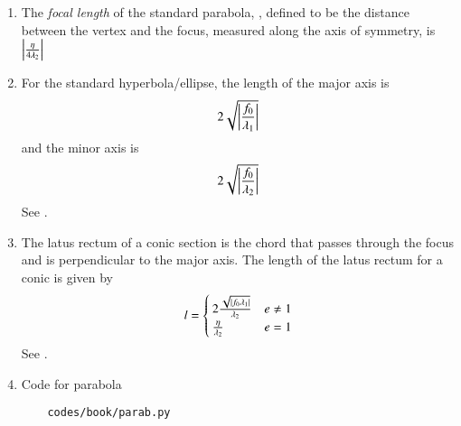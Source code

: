 \begin{enumerate}[label=\thesubsection.\arabic*.,ref=\thesubsection.\theenumi]
	\item
	 The {\em focal length} of the standard parabola, , defined to be the distance between the vertex and the focus, measured along the axis of symmetry, is $\left\vert\frac{\eta}{4 \lambda_2}\right\vert$
    \item For the standard hyperbola/ellipse, the length of the major axis is 
  \begin{align}
\label{eq:chord-len-major}
 2\sqrt{\left\vert\frac{
f_0}
{\lambda_1}
	  \right\vert}
  \end{align}
  and the minor axis is 
  \begin{align}
\label{eq:chord-len-minor}
 2\sqrt{\left\vert\frac{
f_0}
{\lambda_2}
	  \right\vert}
  \end{align}
  \solution 
		See .
\item
    The latus rectum of a conic section is the chord that passes through the focus and is perpendicular to the major axis.
	The length of the latus rectum for a conic is given by
		\begin{align}
			l =
			\begin{cases}
				2\frac{\sqrt{\left\vert f_0\lambda_1\right\vert}}{\lambda_2} & e \ne 1
			\\
			\frac{\eta}{\lambda_2} & e = 1
			\end{cases}
			\label{eq:latus-ellipse}
		\end{align}
		\solution 
		See .
\item Code for parabola 
	\begin{lstlisting}
	codes/book/parab.py
\end{lstlisting}
\end{enumerate}
